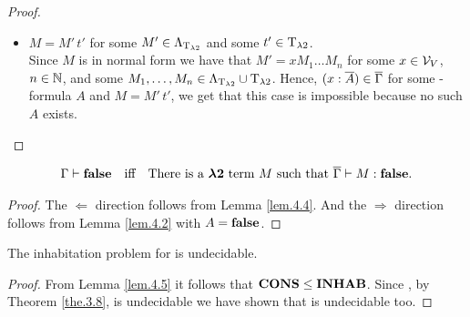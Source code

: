 \begin{proof}
\begin{itemize}
	\item[] \underline{$M=M'\,t'$} for some $M'\in\Lambda_{\text{T}_{\lambda2}}$ and some $t'\in\text{T}_{\lambda2}$.\\
		Since $M$ is in normal form we have that $M'=xM_1\dots M_n$ for some $x\in\mathcal{V}_V$, $n\in\mathbb{N}$, and some $M_1,\dots,M_n\in\Lambda_{\text{T}_{\lambda2}}\cup\text{T}_{\lambda2}$.
		Hence, $(x:\overline{A})\in\overline{\Gamma}$ for some \SysP-formula $A$ and $M=M'\,t'$, we get that this case is impossible because no such $A$ exists.
		
		
		
\end{itemize}
\end{proof}

\begin{lemma}\label{lem.4.5}
\begin{align*}
\Gamma\vdash\textbf{false}&&\text{iff}&&\text{There is a $\boldsymbol{\lambda2}$ term $M$ such that } \overline{\Gamma}\vdash M:\textbf{false}.
\end{align*}
\end{lemma}
\begin{proof}
The $\Leftarrow$ direction follows from Lemma \ref{lem.4.4}. And the $\Rightarrow$ direction follows from Lemma \ref{lem.4.2} with $A=\textbf{false}$.
\end{proof}

\begin{theorem}\label{the.4.6}
The inhabitation problem for \lambdaTwo{} is undecidable.
\end{theorem}
\begin{proof}
From Lemma \ref{lem.4.5} it follows that $\textbf{CONS}\leq\textbf{INHAB}$. Since , by Theorem \ref{the.3.8}, \PCons{} is undecidable we have shown that \lambdaInhab{} is undecidable too.
\end{proof}